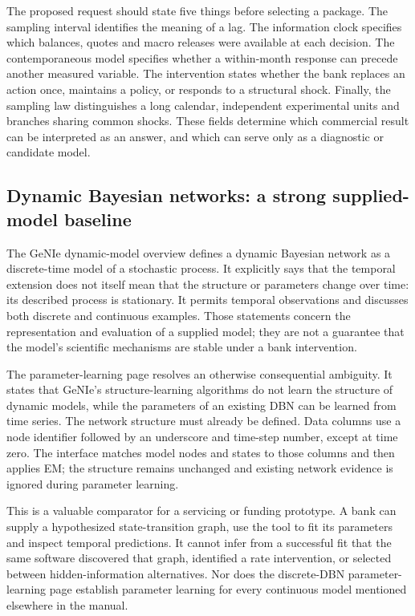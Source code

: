 The proposed request should state five things before selecting a
package. The sampling interval identifies the meaning of a lag. The
information clock specifies which balances, quotes and macro releases
were available at each decision. The contemporaneous model specifies
whether a within-month response can precede another measured variable.
The intervention states whether the bank replaces an action once,
maintains a policy, or responds to a structural shock. Finally, the
sampling law distinguishes a long calendar, independent experimental
units and branches sharing common shocks. These fields determine which
commercial result can be interpreted as an answer, and which can serve
only as a diagnostic or candidate model.

\hypertarget{dynamic-bayesian-networks-a-strong-supplied-model-baseline}{%
\subsection{Dynamic Bayesian networks: a strong supplied-model
baseline}\label{dynamic-bayesian-networks-a-strong-supplied-model-baseline}}

The GeNIe dynamic-model overview defines a dynamic Bayesian network as a
discrete-time model of a stochastic process. It explicitly says that the
temporal extension does not itself mean that the structure or parameters
change over time: its described process is stationary. It permits
temporal observations and discusses both discrete and continuous
examples. Those statements concern the representation and evaluation of
a supplied model; they are not a guarantee that the model's scientific
mechanisms are stable under a bank
intervention.\citep{exec13_ct_genie_dbn}

The parameter-learning page resolves an otherwise consequential
ambiguity. It states that GeNIe's structure-learning algorithms do not
learn the structure of dynamic models, while the parameters of an
existing DBN can be learned from time series. The network structure must
already be defined. Data columns use a node identifier followed by an
underscore and time-step number, except at time zero. The interface
matches model nodes and states to those columns and then applies EM; the
structure remains unchanged and existing network evidence is ignored
during parameter learning. \citep{exec13_ct_genie_learning}

This is a valuable comparator for a servicing or funding prototype. A
bank can supply a hypothesized state-transition graph, use the tool to
fit its parameters and inspect temporal predictions. It cannot infer
from a successful fit that the same software discovered that graph,
identified a rate intervention, or selected between hidden-information
alternatives. Nor does the discrete-DBN parameter-learning page
establish parameter learning for every continuous model mentioned
elsewhere in the manual.

